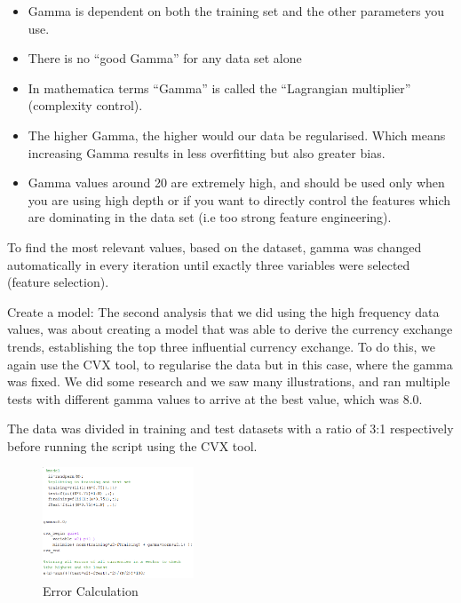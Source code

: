 \begin{itemize}
\item Gamma is dependent on both the training set and the other parameters you use.
\item There is no “good Gamma” for any data set alone
\item In mathematica terms “Gamma” is called the “Lagrangian multiplier” (complexity control).
\item The higher Gamma, the higher would our data be regularised. Which means increasing Gamma results in less overfitting but also greater bias.
\item Gamma values around 20 are extremely high, and should be used only when you are using high depth or if you want to directly control the features which are dominating in the data set (i.e too strong feature engineering). 

\end{itemize}

To find the most relevant values, based on the dataset, gamma was changed automatically in every iteration until exactly three variables were selected (feature selection).

Create a model:
\newline
The second analysis that we did using the high frequency data values, was about creating a model that was able to derive the currency exchange trends, establishing the top three influential currency exchange. To do this, we again use the CVX tool, to regularise the data but in this case, where the gamma was fixed. We did some research and we saw many illustrations, and ran multiple tests with different gamma values to arrive at the best value, which was 8.0.

The data was divided in training and test datasets with a ratio of 3:1 respectively before running the script using the CVX tool.

\begin{figure}[!h]
	\begin{center}
		\includegraphics[width=0.4\textwidth]{error.png}
		\caption{Error Calculation}
		\label{error_calc}
	\end{center}
\end{figure}


